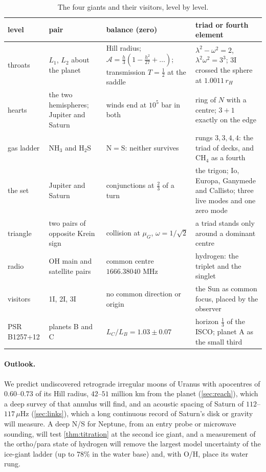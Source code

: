 \documentclass[11pt]{article}
\theoremstyle{definition}\newtheorem{definition}[theorem]{Definition}
\theoremstyle{remark}\newtheorem{remark}[theorem]{Remark}
\newcommand{\muH}{\,\mu\mathrm{Hz}}
\begin{document}
\begin{table}[!htb]\centering\footnotesize
\begin{tabular}{@{}>{\raggedright\arraybackslash}p{2.3cm}>{\raggedright\arraybackslash}p{3.4cm}>{\raggedright\arraybackslash}p{4.3cm}>{\raggedright\arraybackslash}p{4.4cm}@{}}\toprule
level & pair & balance (zero) & triad or fourth element\\\midrule
throats & $L_1$, $L_2$ about the planet & Hill radius; $\mathcal A=\frac h3(1-\frac{h^2}{27}+\dots)$; transmission $T=\frac12$ at the saddle & $\lambda^2-\omega^2=2$, $\lambda^2\omega^2=3^3$; 3I crossed the sphere at $1.0011\,r_H$\\
hearts & the two hemispheres; Jupiter and Saturn & winds end at $10^5$ bar in both & ring of $N$ with a centre; $3+1$ exactly on the edge\\
gas ladder & NH$_3$ and H$_2$S & $\mathrm N=\mathrm S$: neither survives & rungs $3,3,4,4$: the triad of decks, and CH$_4$ as a fourth\\
the set & Jupiter and Saturn & conjunctions at $\frac23$ of a turn & the trigon; Io, Europa, Ganymede and Callisto; three live modes and one zero mode\\
triangle & two pairs of opposite Krein sign & collision at $\mu_G$, $\omega=1/\sqrt2$ & a triad stands only around a dominant centre\\
radio & OH main and satellite pairs & common centre $1666.38040$ MHz & hydrogen: the triplet and the singlet\\
visitors & 1I, 2I, 3I & no common direction or origin & the Sun as common focus, placed by the observer\\
PSR B1257+12 & planets B and C & $L_C/L_B=1.03\pm0.07$ & horizon $\frac13$ of the ISCO; planet A as the small third\\\bottomrule
\end{tabular}
\caption{The four giants and their visitors, level by level.}\label{tab:levels}
\end{table}

\paragraph{Outlook.} We predict undiscovered retrograde irregular moons of Uranus with apocentres of $0.60$--$0.73$ of its Hill radius, $42$--$51$ million km from the planet (\cref{sec:reach}), which a deep survey of that annulus will find, and an acoustic spacing of Saturn of $112$--$117\muH$ (\cref{sec:links}), which a long continuous record of Saturn's disk or gravity will measure. A deep N/S for Neptune, from an entry probe or microwave sounding, will test \cref{thm:titration} at the second ice giant, and a measurement of the ortho/para state of hydrogen will remove the largest model uncertainty of the ice-giant ladder (up to $78\%$ in the water base) and, with O/H, place its water rung.
\end{document}

